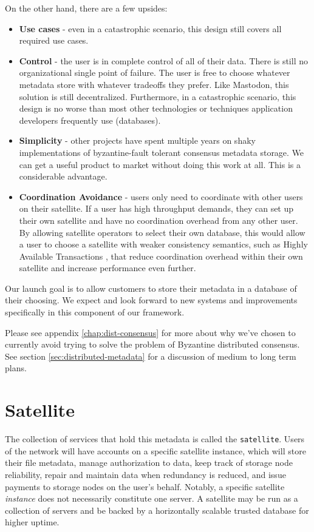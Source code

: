 \documentclass[11pt,fleqn,openany]{book}
\newcommand{\x}[1]{{\tt #1}} \newcommand{\code}[1]{{\em #1}}
\begin{document}
On the other hand, there are a few upsides:
\begin{itemize}
\item {\bf Use cases} - even in a catastrophic scenario, this design still
  covers all required use cases.
\item {\bf Control} - the user is in complete control of all of their data.
  There is still no organizational single point of failure. The user is free
  to choose whatever metadata store with whatever tradeoffs they prefer. Like
  Mastodon\cite{mastodon}, this solution is still decentralized. Furthermore, in a
  catastrophic scenario, this design is no worse than most other technologies or
  techniques application developers frequently use (databases).
\item {\bf Simplicity} - other projects have spent multiple years on shaky
  implementations of byzantine-fault tolerant consensus metadata storage.
  We can get a useful product to market without doing this work at all.
  This is a considerable advantage.
\item {\bf Coordination Avoidance} - users only need to coordinate with
  other users on their satellite. If a user has high throughput demands,
  they can set up their own satellite and have no coordination overhead from
  any other user. By allowing satellite operators to select their own database,
  this would allow a user to choose a satellite with weaker consistency
  semantics, such as Highly Available Transactions \cite{hat}, that reduce
  coordination overhead within their own satellite and increase performance
  even further.
\end{itemize}

Our launch goal is to allow customers to store their metadata in a database of
their choosing. We expect and look forward to new systems and improvements
specifically in this component of our framework.

Please see appendix \ref{chap:dist-consensus} for more about why we've chosen
to currently avoid trying to solve the problem of Byzantine distributed consensus. 
See section \ref{sec:distributed-metadata} for a discussion of medium to
long term plans.

\section{Satellite}

The collection of services that hold this metadata is called the
\x{satellite}. Users of the network will have accounts on a specific
satellite instance, which will store their file metadata, manage authorization
to data, keep track of storage node reliability, repair and maintain data when
redundancy is reduced, and issue payments to storage nodes on the user's behalf.
Notably, a specific satellite {\em instance} does not necessarily constitute one
server. A satellite may be run as a collection of servers and be backed by
a horizontally scalable trusted database for higher uptime.
\end{document}
